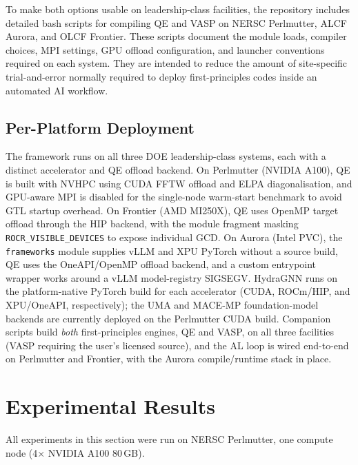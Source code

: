 \documentclass[conference]{IEEEtran}
\def\ac#1{#1}%
\def\acs#1{#1}%
\def\acp#1{#1}%
\begin{document}
To make both options usable on leadership-class facilities, the repository
includes detailed bash scripts for compiling \acs{QE} and \acs{VASP} on \acs{NERSC} Perlmutter,
\acs{ALCF} Aurora, and \acs{OLCF} Frontier. These scripts document the module loads,
compiler choices, \acs{MPI} settings, \acs{GPU} offload configuration, and launcher
conventions required on each system. They are intended to reduce the amount of
site-specific trial-and-error normally required to deploy first-principles codes
inside an automated \acs{AI} workflow.

\subsection{Per-Platform Deployment}
The framework runs on all three \acs{DOE} leadership-class systems, each with a
distinct accelerator and \acs{QE} offload backend. On Perlmutter (NVIDIA A100),
\acs{QE} is built with NVHPC using \acs{CUDA} \ac{FFTW} offload and \ac{ELPA}
diagonalisation, and \acs{GPU}-aware \acs{MPI} is disabled for the single-node
warm-start benchmark to avoid \ac{GTL} startup overhead. On Frontier (AMD
MI250X), \acs{QE} uses OpenMP target offload through the HIP backend, with the
module fragment masking \texttt{ROCR\_VISIBLE\_DEVICES} to expose individual
\acp{GCD}. On Aurora (Intel \acs{PVC}), the \texttt{frameworks} module supplies
vLLM and \ac{XPU} PyTorch without a source build, \acs{QE} uses the OneAPI/OpenMP
offload backend, and a custom entrypoint wrapper works around a vLLM
model-registry SIGSEGV. HydraGNN runs on the platform-native PyTorch build for
each accelerator (\acs{CUDA}, ROCm/HIP, and \acs{XPU}/OneAPI, respectively); the
UMA and MACE-MP foundation-model backends are currently deployed on the
Perlmutter \acs{CUDA} build. Companion scripts build \emph{both} first-principles engines, \acs{QE}
and \acs{VASP}, on all three facilities (\acs{VASP} requiring the user's
licensed source), and the \acs{AL} loop is wired end-to-end on Perlmutter
and Frontier, with the Aurora compile/runtime stack in place.

\section{Experimental Results}
\label{sec:results}

All experiments in this section were run on \acs{NERSC} Perlmutter, one compute node
(4$\times$ NVIDIA A100 80\,GB).
\end{document}
